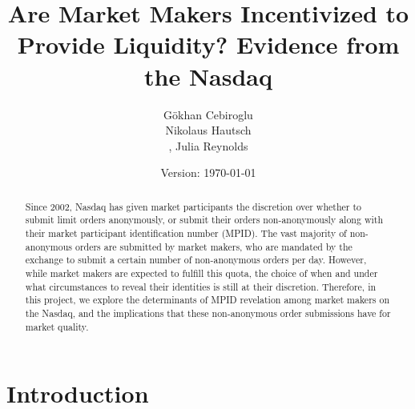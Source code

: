 \documentclass{article}
\begin{document}
\setlength{\parskip}{15pt}

\title{Are Market Makers Incentivized to Provide Liquidity? Evidence from the Nasdaq}
\author{G\"{o}khan Cebiroglu \\ Nikolaus Hautsch \\, Julia Reynolds}
\date{Version: \today}
\maketitle

\begin{abstract}
\noindent Since 2002, Nasdaq has given market participants the discretion over whether to submit limit orders anonymously, or submit their orders non-anonymously along with their market participant identification number (MPID). The vast majority of non-anonymous orders are submitted by market makers, who are mandated by the exchange to submit a certain number of non-anonymous orders per day. However, while market makers are expected to fulfill this quota, the choice of when and under what circumstances to reveal their identities is still at their discretion. Therefore, in this project, we explore the determinants of MPID revelation among market makers on the Nasdaq, and the implications that these non-anonymous order submissions have for market quality.
\end{abstract}

\clearpage 

\section{Introduction}
\end{document}

